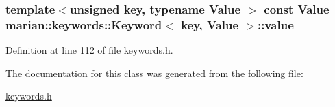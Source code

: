 \subsubsection[{\texorpdfstring{value\+\_\+}{value_}}]{\setlength{\rightskip}{0pt plus 5cm}template$<$unsigned key, typename Value $>$ const Value {\bf marian\+::keywords\+::\+Keyword}$<$ key, Value $>$\+::value\+\_\+\hspace{0.3cm}{\ttfamily [private]}}\hypertarget{classmarian_1_1keywords_1_1Keyword_ab27c78201de04f55b9fd7be52d5b6d05}{}\label{classmarian_1_1keywords_1_1Keyword_ab27c78201de04f55b9fd7be52d5b6d05}


Definition at line 112 of file keywords.\+h.



The documentation for this class was generated from the following file\+:\begin{DoxyCompactItemize}
\item 
\hyperlink{keywords_8h}{keywords.\+h}\end{DoxyCompactItemize}

